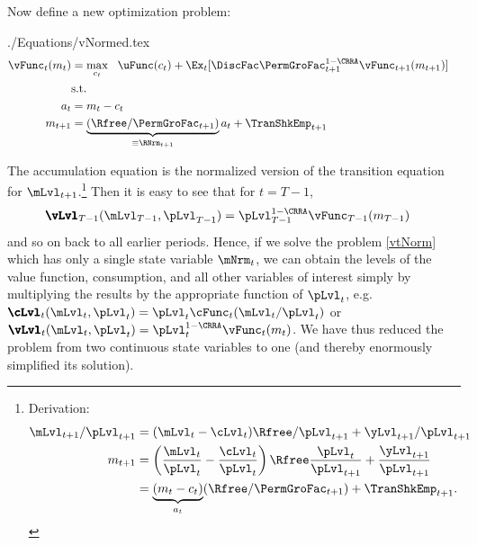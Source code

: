 \documentclass[titlepage, headings=optiontotocandhead]{\econtex}
\begin{document}
Now define a new optimization problem:
\begin{verbatimwrite}{./Equations/vNormed.tex}
  \begin{equation}\begin{gathered}\begin{aligned}
        \null{\vFunc}_{t}({m}_{t})  & = \max_{{c}_{t}} ~~ \uFunc({c}_{t})+
        \Ex_{t}[{\DiscFac} \PermGroFac_{t+1}^{1-\CRRA}\null{\vFunc}_{t+1}({m}_{t+1})] \label{vtNorm}
        \\         & \text{s.t.} &   \nonumber \\
        {a}_{t}    & = {m}_{t}-{c}_{t} \nonumber
        \\      {m}_{t+1}  & = \underbrace{\left(\Rfree/\PermGroFac_{t+1}\right)}_{\equiv \RNrm_{t+1}}{a}_{t}+\TranShkEmp_{t+1} \nonumber
      \end{aligned}\end{gathered}\end{equation}
\end{verbatimwrite}


The accumulation equation is the normalized version of the transition
equation for $\mLvl_{t+1}$.\footnote{Derivation:
  \begin{equation*}\begin{gathered}\begin{aligned}
        \mLvl_{t+1}/\pLvl_{t+1}  & = (\mLvl_{t}-\cLvl_{t})\Rfree/\pLvl_{t+1} + {\yLvl}_{t+1}/\pLvl_{t+1}
        \\      {m}_{t+1}  & = \left(\frac{\mLvl_{t}}{\pLvl_{t}} - \frac{\cLvl_{t}}{\pLvl_{t}}\right)\Rfree\frac{\pLvl_{t}}{\pLvl_{t+1}} + \frac{{\yLvl}_{t+1}}{\pLvl_{t+1}}
        \\        & = \underbrace{({m}_{t} - {c}_{t})}_{{a}_{t}}(\Rfree/\PermGroFac_{t+1}) + \TranShkEmp_{t+1}.
      \end{aligned}\end{gathered}\end{equation*}
}  Then it is easy to see that for $t=T-1$,
\begin{equation*}\begin{gathered}\begin{aligned}
      {\pmb{\vLvl}}
_{T-1}(\mLvl_{T-1},\pLvl_{T-1})  & =  \pLvl_{T-1}^{1-\CRRA}\null{\vFunc}_{T-1}({m}_{T-1})
    \end{aligned}\end{gathered}\end{equation*}
and so on back to all earlier periods.  Hence, if we solve the problem \eqref{vtNorm}
which has only a single state variable $\mNrm_{t}$, we can obtain the levels of
the value function, consumption, and all other variables of interest
simply by multiplying the results by
the appropriate function of $\pLvl_{t}$, e.g.\ ${\pmb{\cLvl}}
_{t}(\mLvl_{t},\pLvl_{t})=\pLvl_{t}\cFunc_{t}(\mLvl_{t}/\pLvl_{t})$ or ${\pmb{\vLvl}}
_{t}({\mLvl}_{t},\pLvl_{t}) = \pLvl_{t}^{1-\CRRA}\vFunc_{t}({m}_{t})$.  We have thus reduced the
problem from two continuous state variables to one (and thereby enormously simplified its solution).
\end{document}
